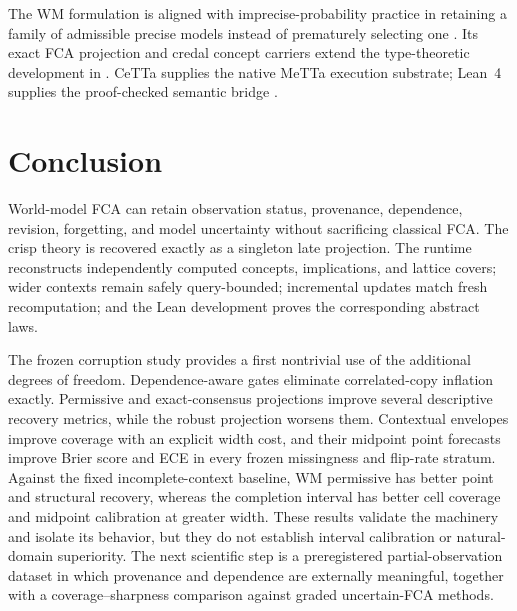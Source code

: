 \documentclass[11pt]{article}
\begin{document}
The WM formulation is aligned with imprecise-probability practice in retaining
a family of admissible precise models instead of prematurely selecting one
\cite{walley1991}. Its exact FCA projection and credal concept carriers extend
the type-theoretic development in \cite{credalconcept}. CeTTa supplies the
native MeTTa execution substrate; Lean~4 supplies the proof-checked semantic
bridge \cite{lean4}.

\section{Conclusion}

World-model FCA can retain observation status, provenance, dependence,
revision, forgetting, and model uncertainty without sacrificing classical
FCA. The crisp theory is recovered exactly as a singleton late projection.
The runtime reconstructs independently computed concepts, implications, and
lattice covers; wider contexts remain safely query-bounded; incremental
updates match fresh recomputation; and the Lean development proves the
corresponding abstract laws.

The frozen corruption study provides a first nontrivial use of the additional
degrees of freedom. Dependence-aware gates eliminate correlated-copy
inflation exactly. Permissive and exact-consensus projections improve several
descriptive recovery metrics, while the robust projection worsens them.
Contextual envelopes improve coverage with an explicit width cost, and their
midpoint point forecasts improve Brier score and ECE in every frozen
missingness and flip-rate stratum. Against the fixed incomplete-context
baseline, WM permissive has better point and structural recovery, whereas the
completion interval has better cell coverage and midpoint calibration at
greater width. These results validate the machinery and isolate its behavior,
but they do not establish interval calibration or natural-domain superiority.
The next scientific step is a preregistered partial-observation dataset in
which provenance and dependence are externally meaningful, together with a
coverage--sharpness comparison against graded uncertain-FCA methods.
\end{document}
